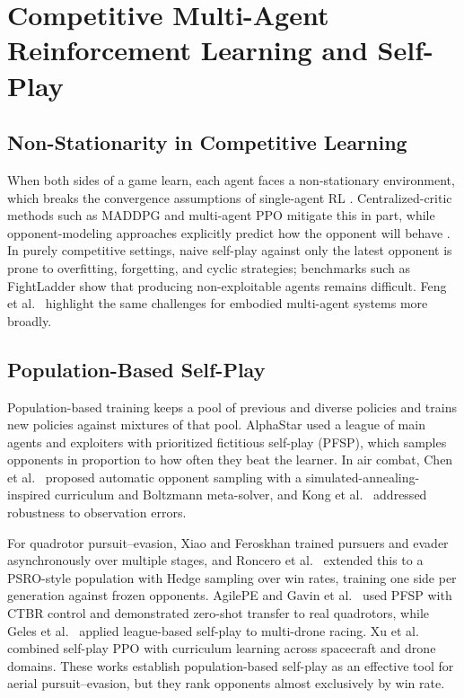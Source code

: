 \section{Competitive Multi-Agent Reinforcement Learning and Self-Play}

\subsection{Non-Stationarity in Competitive Learning}
\noindent
When both sides of a game learn, each agent faces a non-stationary environment, which breaks the convergence assumptions of single-agent RL \cite{zhangMultiAgentReinforcementLearning2021, liangReviewMultiAgentReinforcement2025}. Centralized-critic methods such as MADDPG \cite{loweMultiAgentActorCriticMixed2017} and multi-agent PPO \cite{yuSurprisingEffectivenessPPO} mitigate this in part, while opponent-modeling approaches explicitly predict how the opponent will behave \cite{tianMultiagentActorcriticTime2023}. In purely competitive settings, naive self-play against only the latest opponent is prone to overfitting, forgetting, and cyclic strategies; benchmarks such as FightLadder \cite{liFightLadderBenchmarkCompetitive2024} show that producing non-exploitable agents remains difficult. Feng et al.\ \cite{fengMultiagentEmbodiedAI2026} highlight the same challenges for embodied multi-agent systems more broadly.

\subsection{Population-Based Self-Play}
\noindent
Population-based training keeps a pool of previous and diverse policies and trains new policies against mixtures of that pool. AlphaStar \cite{vinyalsGrandmasterLevelStarCraft2019} used a league of main agents and exploiters with prioritized fictitious self-play (PFSP), which samples opponents in proportion to how often they beat the learner. In air combat, Chen et al.\ \cite{chenAutonomousDogfightDecisionMaking2025} proposed automatic opponent sampling with a simulated-annealing-inspired curriculum and Boltzmann meta-solver, and Kong et al.\ \cite{kongUAVAutonomousAerial2020} addressed robustness to observation errors.

For quadrotor pursuit--evasion, Xiao and Feroskhan \cite{xiaoLearningMultipursuitEvasion2024} trained pursuers and evader asynchronously over multiple stages, and Roncero et al.\ \cite{ronceroLearnedControllersAgile2026} extended this to a PSRO-style population with Hedge sampling over win rates, training one side per generation against frozen opponents. AgilePE \cite{tangAgilePEAutonomousUAV2026a} and Gavin et al.\ \cite{gavinAgileInterceptionFlying2026, gavinInterceptingAgileTarget2026} used PFSP with CTBR control and demonstrated zero-shot transfer to real quadrotors, while Geles et al.\ \cite{gelesSuperhumanSafeAgile2026} applied league-based self-play to multi-drone racing. Xu et al.\ \cite{xuDRLFrameworkAutonomous2025} combined self-play PPO with curriculum learning across spacecraft and drone domains. These works establish population-based self-play as an effective tool for aerial pursuit--evasion, but they rank opponents almost exclusively by win rate.

